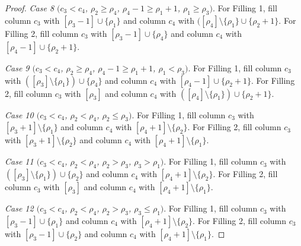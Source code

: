 \documentclass[ALCO,ThmDefs,Unicode,epreuves]{cedram}
\let\hypertargeta\hypertarget %
\newenvironment{Case}[1]{\par\vskip2pt\noindent%
\emph{#1}.}{\vskip2pt}
\begin{document}
\begin{proof}
\begin{Case}
{\hypertargeta{prop3.7case_8}{Case 8} $(c_3 < c_4$, $\rho_2\geq \rho_4$, $\rho_4-1 \geq \rho_1+1$, $\rho_1\geq \rho_3)$} 
For Filling 1, fill column $c_3$ with $[\rho_3-1]\cup \{\rho_1\}$ and column $c_4$ with $([\rho_4]\setminus\{\rho_1\}\cup \{\rho_2+1\}$. For Filling 2, fill column $c_3$ with $[\rho_3-1]\cup \{\rho_4\}$ and column $c_4$ with $[\rho_4-1]\cup \{\rho_2+1\}$.
\end{Case}

\begin{Case}
{\hypertargeta{prop3.7case_9}{Case 9} $(c_3 < c_4$, $\rho_2\geq \rho_4$, $\rho_4-1 \geq \rho_1+1$, $\rho_1< \rho_3)$} 
For Filling 1, fill column $c_3$ with $([\rho_3]\setminus \{\rho_1\})\cup \{\rho_4\}$ and column $c_4$ with $[\rho_4-1]\cup \{\rho_2+1\}$.
For Filling 2, fill column $c_3$ with $[\rho_3]$ and column $c_4$ with $([\rho_4]\setminus\{\rho_1\})\cup \{\rho_2+1\}$.
\end{Case}

\begin{Case}
{\hypertargeta{prop3.7case_10}{Case 10} $(c_3 < c_4$, $\rho_2< \rho_4$, $\rho_2 \leq \rho_3)$} 
For Filling 1, fill column $c_3$ with $[\rho_3+1]\setminus \{\rho_1\}$ and column $c_4$ with $[\rho_4+1]\setminus \{\rho_2\}$. For Filling 2, fill column $c_3$ with $[\rho_3+1]\setminus \{\rho_2\}$ and column $c_4$ with $[\rho_4+1]\setminus \{\rho_1\}$.
\end{Case}

\begin{Case}
{\hypertargeta{prop3.7case_11}{Case 11} $(c_3 < c_4$, $\rho_2< \rho_4$, $\rho_2 > \rho_3$, $\rho_3>\rho_1)$} 
For Filling 1, fill column $c_3$ with $([\rho_3]\setminus \{\rho_1\})\cup \{\rho_2\}$ and column $c_4$ with $[\rho_4+1]\setminus \{\rho_2\}$. For Filling 2, fill column $c_3$ with $[\rho_3]$ and column $c_4$ with $[\rho_4+1]\setminus \{\rho_1\}$.
\end{Case}

\begin{Case}
{\hypertargeta{prop3.7case_12}{Case 12} $(c_3 < c_4$, $\rho_2< \rho_4$, $\rho_2 > \rho_3$, $\rho_3\leq\rho_1)$} 
For Filling 1, fill column $c_3$ with $[\rho_3-1]\cup \{\rho_1\}$ and column $c_4$ with $[\rho_4+1]\setminus \{\rho_2\}$. For Filling 2, fill column $c_3$ with $[\rho_3-1]\cup \{\rho_2\}$ and column $c_4$ with $[\rho_4+1]\setminus \{\rho_1\}$.
\end{Case}


\end{proof}
\end{document}
